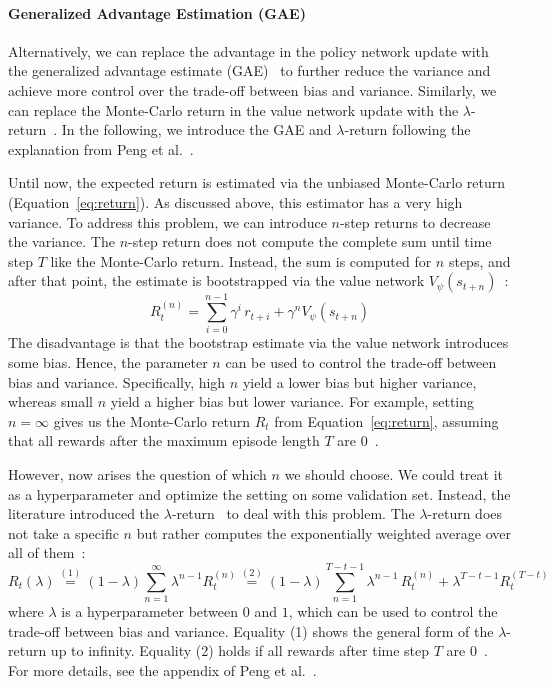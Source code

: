 \paragraph{Generalized Advantage Estimation (GAE)}
Alternatively, we can replace the advantage in the policy network update with the 
generalized advantage estimate (GAE)~\cite{Schulman2016GAE} to further reduce the variance and achieve more control over the trade-off between bias and variance. Similarly, we can replace the Monte-Carlo return in the value network 
update with the $\lambda$-return~\cite{Sutton1998RL}.
In the following, we introduce the GAE and $\lambda$-return following the 
explanation from Peng et al.~\cite{Peng2018Mimic}.

Until now, the expected return is estimated via the unbiased Monte-Carlo 
return (Equation~\ref{eq:return}).
As discussed above, this estimator has a very high variance.
To address this problem, we can introduce $n$-step returns to decrease the variance.
The $n$-step return does not compute the complete sum until time step $T$ like the Monte-Carlo
return. Instead, the sum is computed for $n$ steps, and after that point, the estimate is 
bootstrapped via the value network $V_\psi(s_{t+n})$~\cite{Silver2015RL, Peng2018Mimic}:
\begin{equation}
	R_t^{(n)} = \sum_{i=0}^{n-1} \gamma^i \, r_{t+i} + \gamma^n V_{\psi} (s_{t+n}) 
\end{equation}
The disadvantage is that the bootstrap estimate via the value network introduces some bias.
Hence, the parameter $n$ can be used to control the trade-off between 
bias and variance. Specifically, high $n$ yield a lower bias but higher variance, whereas 
small $n$ yield a higher bias but lower variance. For example, setting $n=\infty$ gives us the 
Monte-Carlo return $R_t$ from Equation~\ref{eq:return}, assuming that all rewards after the maximum 
episode length $T$ are $0$~\cite{Peng2018Mimic}.

However, now arises the question of which $n$ we should choose. We could treat it as 
a hyperparameter and optimize the setting on some validation set.
Instead, the literature introduced the $\lambda$-return~\cite{Sutton1998RL} to deal with this problem.
The $\lambda$-return does not take a specific $n$ but rather computes the exponentially 
weighted average over all of them~\cite{Peng2018Mimic}: 
\begin{equation}
	R_t(\lambda) \stackrel{(1)}{=} (1- \lambda) \sum_{n=1}^{\infty} \lambda^{n-1} R_t^{(n)} \stackrel{(2)}{=} (1-\lambda) \sum_{n=1}^{T-t-1} \lambda^{n-1} \, R_t^{(n)} + \lambda^{T-t-1} R_t^{(T-t)} 
\end{equation}
where $\lambda$ is a hyperparameter between $0$ and $1$, which can be used to control the trade-off between bias and variance. Equality (1) shows the general
form of the $\lambda$-return up to infinity. Equality (2) holds if all  
rewards after time step $T$ are $0$~\cite{Peng2018Mimic}. For more details, see 
the appendix of Peng et al.~\cite{Peng2018Mimic}.

